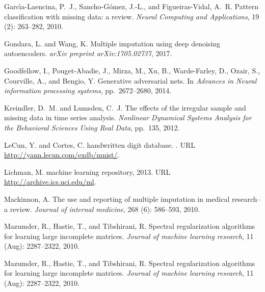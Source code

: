 \documentclass{article}
\begin{document}
\begin{thebibliography}{29}
	Garc{\'\i}a-Laencina, P.~J., Sancho-G{\'o}mez, J.-L., and Figueiras-Vidal,
	A.~R.
	\newblock Pattern classification with missing data: a review.
	\newblock \emph{Neural Computing and Applications}, 19 (2):
	263--282, 2010.
	
	Gondara, L. and Wang, K.
	\newblock Multiple imputation using deep denoising autoencoders.
	\newblock \emph{arXiv preprint arXiv:1705.02737}, 2017.
	
	Goodfellow, I., Pouget-Abadie, J., Mirza, M., Xu, B., Warde-Farley, D., Ozair,
	S., Courville, A., and Bengio, Y.
	\newblock Generative adversarial nets.
	\newblock In \emph{Advances in Neural information processing systems}, pp.\
	2672--2680, 2014.
	
	Kreindler, D.~M. and Lumsden, C.~J.
	\newblock The effects of the irregular sample and missing data in time series
	analysis.
	\newblock \emph{Nonlinear Dynamical Systems Analysis for the Behavioral
		Sciences Using Real Data}, pp.\  135, 2012.
	
	LeCun, Y. and Cortes, C.
	 handwritten digit database.
	.
	\newblock URL \url{http://yann.lecun.com/exdb/mnist/}.
	
	Lichman, M.
	 machine learning repository, 2013.
	\newblock URL \url{http://archive.ics.uci.edu/ml}.
	
	Mackinnon, A.
	\newblock The use and reporting of multiple imputation in medical research--a
	review.
	\newblock \emph{Journal of internal medicine}, 268 (6):
	586--593, 2010.
	
	Mazumder, R., Hastie, T., and Tibshirani, R.
	\newblock Spectral regularization algorithms for learning large incomplete
	matrices.
	\newblock \emph{Journal of machine learning research}, 11
	(Aug):\penalty0 2287--2322, 2010{\natexlab{a}}.
	
	Mazumder, R., Hastie, T., and Tibshirani, R.
	\newblock Spectral regularization algorithms for learning large incomplete
	matrices.
	\newblock \emph{Journal of machine learning research}, 11
	(Aug):\penalty0 2287--2322, 2010{\natexlab{b}}.
	

\end{thebibliography}
\end{document}
